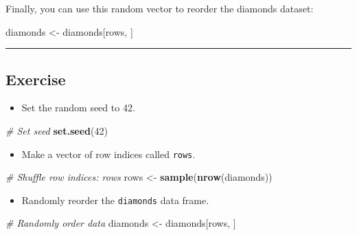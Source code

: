 \documentclass[
]{book}
\newenvironment{Shaded}{\begin{snugshade}}{\end{snugshade}}
\newcommand{\CommentTok}[1]{\textcolor[rgb]{0.56,0.35,0.01}{\textit{#1}}}
\newcommand{\DecValTok}[1]{\textcolor[rgb]{0.00,0.00,0.81}{#1}}
\newcommand{\KeywordTok}[1]{\textcolor[rgb]{0.13,0.29,0.53}{\textbf{#1}}}
\newcommand{\NormalTok}[1]{#1}
\newcommand{\StringTok}[1]{\textcolor[rgb]{0.31,0.60,0.02}{#1}}
\providecommand{\tightlist}{%
  \setlength{\itemsep}{0pt}\setlength{\parskip}{0pt}}
\begin{document}
Finally, you can use this random vector to reorder the diamonds dataset:

\begin{Shaded}
\begin{Highlighting}[]
\NormalTok{diamonds <-}\StringTok{ }\NormalTok{diamonds[rows, ]}
\end{Highlighting}
\end{Shaded}

\begin{center}\rule{0.5\linewidth}{0.5pt}\end{center}

\hypertarget{exercise-1}{%
\subsection*{Exercise}\label{exercise-1}}

\begin{itemize}
\tightlist
\item
  Set the random seed to 42.
\end{itemize}

\begin{Shaded}
\begin{Highlighting}[]
\CommentTok{# Set seed}
\KeywordTok{set.seed}\NormalTok{(}\DecValTok{42}\NormalTok{)}
\end{Highlighting}
\end{Shaded}

\begin{itemize}
\tightlist
\item
  Make a vector of row indices called \texttt{rows}.
\end{itemize}

\begin{Shaded}
\begin{Highlighting}[]
\CommentTok{# Shuffle row indices: rows}
\NormalTok{rows <-}\StringTok{ }\KeywordTok{sample}\NormalTok{(}\KeywordTok{nrow}\NormalTok{(diamonds))}
\end{Highlighting}
\end{Shaded}

\begin{itemize}
\tightlist
\item
  Randomly reorder the \texttt{diamonds} data frame.
\end{itemize}

\begin{Shaded}
\begin{Highlighting}[]
\CommentTok{# Randomly order data}
\NormalTok{diamonds <-}\StringTok{ }\NormalTok{diamonds[rows, ]}
\end{Highlighting}
\end{Shaded}
\end{document}
